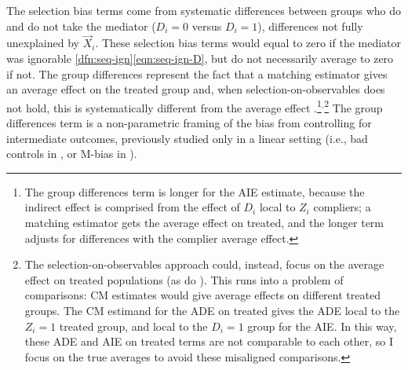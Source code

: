 The selection bias terms come from systematic differences between groups who do and do not take the mediator ($D_i = 0$ versus $D_i = 1$), differences not fully unexplained by $\vec X_i$.
These selection bias terms would equal to zero if the mediator was ignorable \ref{dfn:seq-ign}\eqref{eqn:seq-ign-D}, but do not necessarily average to zero if not.
The group differences represent the fact that a matching estimator gives an average effect on the treated group and, when selection-on-observables does not hold, this is systematically different from the average effect \citep{heckman1998characterizing}.\footnote{
    The group differences term is longer for the AIE estimate, because the indirect effect is comprised from the effect of $D_i$ local to $Z_i$ compliers; a matching estimator gets the average effect on treated, and the longer term adjusts for differences with the complier average effect.
}$^{,}$\footnote{
    The selection-on-observables approach could, instead, focus on the average effect on treated populations (as do \citealt{keele2015identifying}).
    This runs into a problem of comparisons: CM estimates would give average effects on different treated groups.
    The CM estimand for the ADE on treated gives the ADE local to the $Z_i = 1$ treated group, and local to the $D_i = 1$ group for the AIE.
    In this way, these ADE and AIE on treated terms are not comparable to each other, so I focus on the true averages to avoid these misaligned comparisons.
}
The group differences term is a non-parametric framing of the bias from controlling for intermediate outcomes, previously studied only in a linear setting (i.e., bad controls in \citealt{cinelli2024crash}, or M-bias in \citealt{ding2015adjust}).
